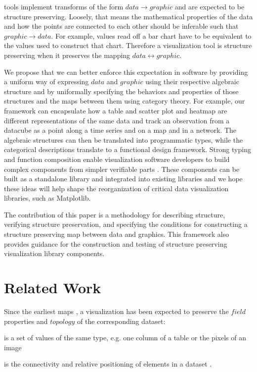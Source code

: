 \documentclass[journal]{IEEEtran}
\theoremstyle{definition}
\theoremstyle{remark}
\begin{document}
 tools implement transforms of the form $data \rightarrow graphic$ and are expected to be structure preserving. Loosely, that means the mathematical properties of the data and how the points are connected to each other should be inferable such that  $graphic \rightarrow data$. For example, values read off a bar chart have to be equivalent to the values used to construct that chart. Therefore a visualization tool is structure preserving when it preserves the mapping $data\leftrightarrow graphic$.

We propose that we can better enforce this expectation in software by providing a uniform way of expressing $data$ and $graphic$ using their respective algebraic structure and by uniformally specifying the behaviors and properties of those structures and the maps between them using category theory. For example, our framework can encapsulate how a table and scatter plot and heatmap are different representations of the same data and track an observation from a datacube as a point along a time series and on a map and in a network. The algebraic structures can then be translated into programmatic types, while the categorical descriptions translate to a functional design framework. Strong typing and function composition enable visualization software developers to build complex components from simpler verifiable parts \cite{huHowFunctionalProgramming2015, hughesWhyFunctionalProgramming1989}. These  components can be built as a standalone library and integrated into existing libraries and we hope these ideas will help shape the reorganization of critical data visualization libraries, such as Matplotlib.

The contribution of this paper is a methodology for describing structure, verifying structure preservation, and specifying the conditions for constructing a structure preserving map between data and graphics. This framework also provides guidance for the construction and testing of structure preserving visualization library components.

\section{Related Work}
\label{sec:related-work:continuity}

Since the earliest maps \cite{friendlyBriefHistoryData2006}, a visualization has been expected to preserve the $field$ properties and $topology$ of the corresponding dataset:
\begin{LaTeXdescription}
  \item[\textcolor{fiber}{\textbf{field}} \footnote{Throughout this paper, we augment the math with color to group conceptually related terms\cite{headMathAugmentationHow2022}, for example \textcolor{fiber}{field} and \textcolor{fiber}{fiber}. This color coding carries through to the figures.}]  is a set of values of the same type, e.g. one column of a table or the pixels of an image
  \item[\textcolor{base}{\textbf{topology}}] is the connectivity and relative positioning of elements in a dataset \cite{wilkinsonGrammarGraphics2005}.
\end{LaTeXdescription}
\end{document}
